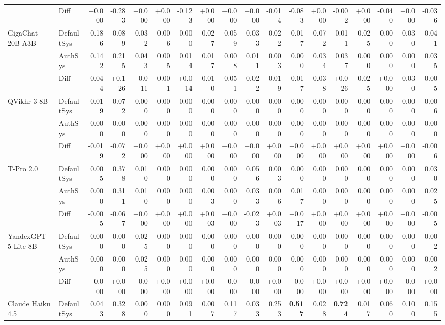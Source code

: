 \begin{table}[htbp]
{\begin{tabular}{llrrrrrrrrrrrrrrrr}
\rowcolor{Gray} & Diff & +0.000 & -0.283 & +0.000 & +0.000 & -0.123 & +0.000 & +0.000 & +0.000 & -0.014 & -0.083 & +0.000 & -0.002 & +0.000 & -0.040 & +0.000 & -0.036 \\
GigaChat 20B-A3B & DefaultSys & 0.186 & 0.089 & 0.032 & 0.006 & 0.000 & 0.027 & 0.059 & 0.033 & 0.022 & 0.017 & 0.072 & 0.011 & 0.025 & 0.000 & 0.030 & 0.041 \\
 & AuthSys & 0.142 & 0.215 & 0.043 & 0.005 & 0.014 & 0.017 & 0.008 & 0.011 & 0.003 & 0.000 & 0.034 & 0.037 & 0.000 & 0.000 & 0.000 & 0.035 \\
\rowcolor{Gray} & Diff & -0.044 & +0.126 & +0.011 & -0.001 & +0.014 & -0.010 & -0.051 & -0.022 & -0.019 & -0.017 & -0.038 & +0.026 & -0.025 & +0.000 & -0.030 & -0.005 \\
QVikhr 3 8B & DefaultSys & 0.019 & 0.072 & 0.000 & 0.000 & 0.000 & 0.000 & 0.000 & 0.000 & 0.000 & 0.000 & 0.000 & 0.000 & 0.000 & 0.000 & 0.000 & 0.006 \\
 & AuthSys & 0.000 & 0.000 & 0.000 & 0.000 & 0.000 & 0.000 & 0.000 & 0.000 & 0.000 & 0.000 & 0.000 & 0.000 & 0.000 & 0.000 & 0.000 & 0.000 \\
\rowcolor{Gray} & Diff & -0.019 & -0.072 & +0.000 & +0.000 & +0.000 & +0.000 & +0.000 & +0.000 & +0.000 & +0.000 & +0.000 & +0.000 & +0.000 & +0.000 & +0.000 & -0.006 \\
T-Pro 2.0 & DefaultSys & 0.005 & 0.378 & 0.010 & 0.000 & 0.000 & 0.000 & 0.000 & 0.056 & 0.003 & 0.000 & 0.000 & 0.000 & 0.000 & 0.000 & 0.000 & 0.030 \\
 & AuthSys & 0.000 & 0.311 & 0.010 & 0.000 & 0.000 & 0.003 & 0.000 & 0.033 & 0.006 & 0.017 & 0.000 & 0.000 & 0.000 & 0.000 & 0.000 & 0.025 \\
\rowcolor{Gray} & Diff & -0.005 & -0.067 & +0.000 & +0.000 & +0.000 & +0.003 & +0.000 & -0.023 & +0.003 & +0.017 & +0.000 & +0.000 & +0.000 & +0.000 & +0.000 & -0.005 \\
YandexGPT 5 Lite 8B & DefaultSys & 0.000 & 0.000 & 0.025 & 0.000 & 0.000 & 0.000 & 0.000 & 0.000 & 0.000 & 0.000 & 0.000 & 0.000 & 0.000 & 0.000 & 0.000 & 0.002 \\
 & AuthSys & 0.000 & 0.000 & 0.025 & 0.000 & 0.000 & 0.000 & 0.000 & 0.000 & 0.000 & 0.000 & 0.000 & 0.000 & 0.000 & 0.000 & 0.000 & 0.002 \\
\rowcolor{Gray} & Diff & +0.000 & +0.000 & +0.000 & +0.000 & +0.000 & +0.000 & +0.000 & +0.000 & +0.000 & +0.000 & +0.000 & +0.000 & +0.000 & +0.000 & +0.000 & +0.000 \\
Claude Haiku 4.5 & DefaultSys & 0.043 & 0.328 & 0.000 & 0.000 & 0.091 & 0.007 & 0.117 & 0.033 & 0.253 & \textbf{0.517} & 0.028 & \textbf{0.724} & 0.017 & 0.060 & 0.100 & 0.155 \\

\end{tabular}}
\end{table}
